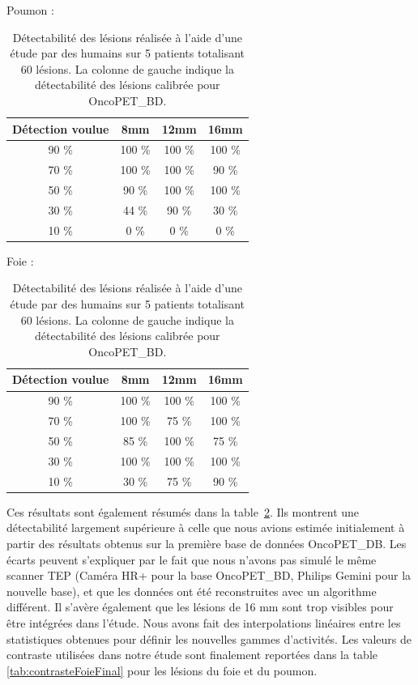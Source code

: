 \begin{table}
\centering
Poumon :\\
\begin{tabular}{|c|c|c|c|}
 \hline
 Détection voulue & 	8mm & 	12mm & 	16mm \\
\hline
90 \%		  & 100 \%  & 100 \% & 100 \% \\
\hline
70 \%		  & 100 \%  & 100 \% & 90 \%\\
\hline
50 \%		  & 90 \%  & 100 \% & 100 \%\\
\hline
30 \%		  & 44 \%  & 90 \% & 30 \%\\
\hline
10 \% 		  & 0 \%  & 0 \% & 0 \%\\
\hline
\end{tabular}

\vspace{0.5cm}

Foie :\\
\begin{tabular}{|c|c|c|c|}
 \hline
 Détection voulue & 	8mm & 	12mm & 	16mm \\
\hline
90 \%		  & 100 \%  & 100 \% & 100 \% \\
\hline
70 \%		  & 100 \%  & 75 \% & 100 \%\\
\hline
50 \%		  & 85 \%  & 100 \% & 75 \%\\
\hline
30 \%		  & 100 \%  & 100 \% & 100 \%\\
\hline
10 \% 		  & 30 \%  & 75 \% & 90 \%\\
\hline
\end{tabular}
\caption[Détectabilité estimée des lésions en fonction du contraste et de leur diamètre]{Détectabilité des lésions réalisée à l'aide d'une étude par des humains sur 5 patients totalisant 60 lésions. La colonne de gauche indique la détectabilité des lésions calibrée pour OncoPET\_BD.}
\label{fig:detectabiliteVue}
\end{table}

Ces résultats sont également résumés dans la table~\ref{fig:detectabiliteVue}. Ils montrent une détectabilité largement supérieure à celle que nous avions estimée initialement à partir des résultats obtenus sur la première base de données OncoPET\_DB. Les écarts peuvent s'expliquer par le fait que nous n'avons pas simulé le même scanner TEP (Caméra HR+ pour la base OncoPET\_BD, Philips Gemini pour la nouvelle base), et que les données ont été reconstruites avec un algorithme différent. Il s'avère également que les lésions de 16 mm sont trop visibles pour être intégrées dans l'étude. Nous avons fait des interpolations linéaires entre les statistiques obtenues pour définir les nouvelles gammes d'activités. Les valeurs de contraste utilisées dans notre étude sont finalement reportées dans la table \ref{tab:contrasteFoieFinal} pour les lésions du foie et du poumon.



